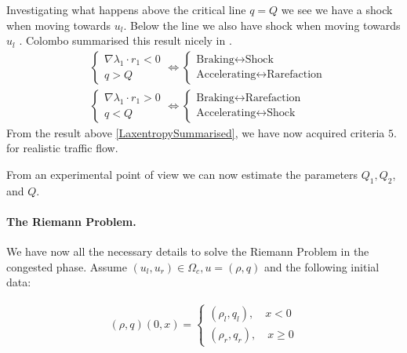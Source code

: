 \documentclass{article}
\numberwithin{equation}{section}
\begin{document}
Investigating what happens above the critical line $ q = Q$ we see we have a shock when moving towards $u_l$. 
Below the line we also have shock when moving towards $u_l$ . Colombo summarised this result nicely in \cite{Colombo2002}. \begin{align}
   & \begin{cases}
    \nabla \lambda_1 \cdot r_1 < 0 \\
    q > Q
    \end{cases} \iff \begin{cases}
    \text{Braking} \leftrightarrow \text{Shock} \\
    \text{Accelerating} \leftrightarrow \text{Rarefaction} 
    \end{cases} \\
   &\begin{cases}
    \nabla \lambda_1 \cdot r_1 > 0 \\
    q < Q
    \end{cases} \iff \begin{cases}
    \text{Braking} \leftrightarrow \text{Rarefaction} \\
    \text{Accelerating} \leftrightarrow \text{Shock} 
    \end{cases}
    \label{LaxentropySummarised}
\end{align} From the result above \ref{LaxentropySummarised}, we have now acquired criteria $5.$ for realistic traffic flow. 

From an experimental point of view we can now estimate the parameters $Q_1, Q_2$, and $Q$. 


\paragraph{The Riemann Problem.}
We have now all the necessary details to solve the Riemann Problem in the congested phase. Assume $(u_l, u_r) \in \Omega_c, u = (\rho, q)$ and the following initial data: 

\begin{align*}
    (\rho, q) (0,x) = \begin{cases}
    (\rho_l, q_l), \quad  x < 0 \\
    (\rho_r, q_r), \quad  x \geq 0
    \end{cases}
\end{align*}
\end{document}
